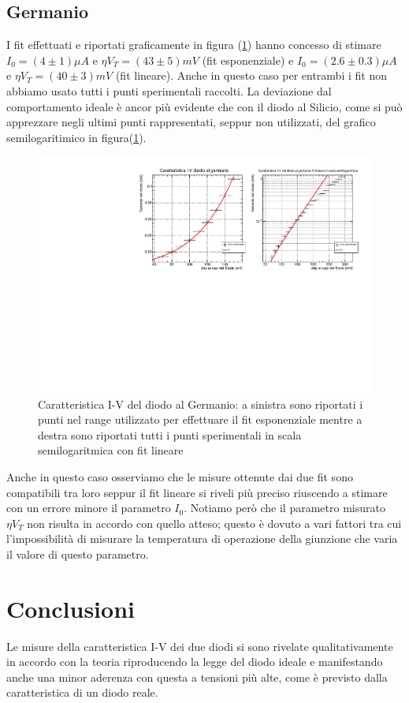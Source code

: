 \documentclass[]{article}
\begin{document}
\subsection{Germanio}
I fit effettuati e riportati graficamente in figura (\ref{fig:germanio}) hanno concesso di stimare $I_0=(4\pm1)\mu A$ e $\eta V_T=(43\pm5)mV$ (fit esponenziale) e $I_0=(2.6\pm0.3)\mu A$ e $\eta V_T=(40\pm3)mV$ (fit lineare). Anche in questo caso per entrambi i fit non abbiamo usato tutti i punti sperimentali raccolti. La deviazione dal comportamento ideale è ancor più evidente che con il diodo al Silicio, come si può apprezzare negli ultimi punti rappresentati, seppur non utilizzati, del grafico semilogaritimico in figura(\ref{fig:germanio}).
\begin{figure}[H]
	\centering
	\includegraphics[width=0.9\linewidth]{../Germanio/canvas}
	\caption{Caratteristica I-V del diodo al Germanio: a sinistra sono riportati i punti nel range utilizzato per effettuare il fit esponenziale mentre a destra sono riportati tutti i punti sperimentali in scala semilogaritmica con fit lineare}
	\label{fig:germanio}
\end{figure}
Anche in questo caso osserviamo che le misure ottenute dai due fit sono compatibili tra loro seppur il fit lineare si riveli più preciso riuscendo a stimare con un errore minore il parametro $I_0$.
Notiamo però che il parametro misurato $\eta V_T$ non risulta in accordo con quello atteso; questo è dovuto a vari fattori tra cui l'impossibilità di misurare la temperatura di operazione della giunzione che varia il valore di questo parametro.
\section*{Conclusioni}
Le misure della caratteristica I-V dei due diodi si sono rivelate qualitativamente in accordo con la teoria riproducendo la legge del diodo ideale e manifestando anche una minor aderenza con questa a tensioni più alte, come è previsto dalla caratteristica di un diodo reale. 
\end{document}
